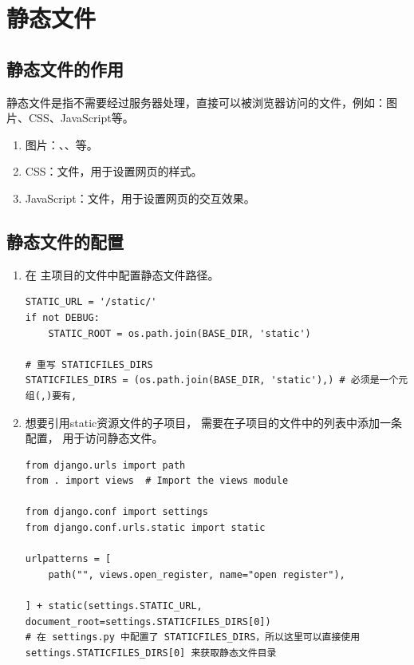 \section{静态文件}

\subsection{静态文件的作用}

静态文件是指不需要经过服务器处理，直接可以被浏览器访问的文件，例如：图片、CSS、JavaScript等。

\begin{enumerate}[label=\arabic*)]
    \item 图片：、、等。
    \item CSS：文件，用于设置网页的样式。
    \item JavaScript：文件，用于设置网页的交互效果。
\end{enumerate}

\subsection{静态文件的配置}
\begin{enumerate}[label=\arabic*)]
  \item 在 \textcolor{YBXPurple}{主项目}的文件中配置静态文件路径。
\begin{lstlisting}[style=demostyle,numbers=none]
STATIC_URL = '/static/'
if not DEBUG:
    STATIC_ROOT = os.path.join(BASE_DIR, 'static')

# 重写 STATICFILES_DIRS    
STATICFILES_DIRS = (os.path.join(BASE_DIR, 'static'),) # 必须是一个元组(,)要有,
\end{lstlisting} 

  \item 想要引用static资源文件的\textcolor{YBXPurple}{子项目}，
  需要在\textcolor{YBXPurple}{子项目}的文件中的列表中添加一条配置，
  用于访问静态文件。

\begin{lstlisting}[style=demostyle,numbers=none]
from django.urls import path
from . import views  # Import the views module

from django.conf import settings
from django.conf.urls.static import static

urlpatterns = [
    path("", views.open_register, name="open register"),  
    
] + static(settings.STATIC_URL, document_root=settings.STATICFILES_DIRS[0]) 
# 在 settings.py 中配置了 STATICFILES_DIRS，所以这里可以直接使用 settings.STATICFILES_DIRS[0] 来获取静态文件目录
\end{lstlisting} 
\end{enumerate}

